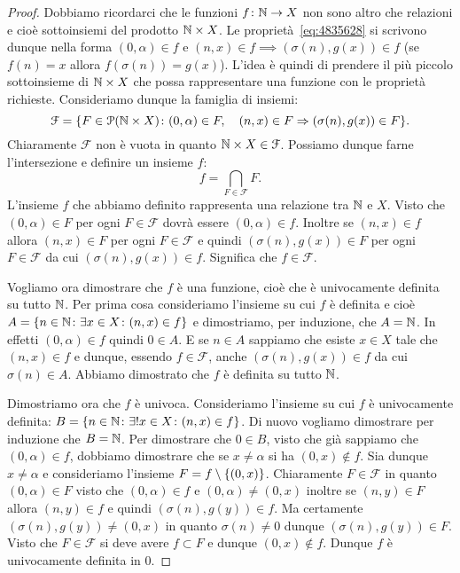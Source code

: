 \begin{proof}
Dobbiamo ricordarci che le funzioni $f\colon {\mathbb N} \to X$ non sono altro che relazioni 
e cioè sottoinsiemi del prodotto ${\mathbb N}\times X$.
Le proprietà~\eqref{eq:4835628} si scrivono dunque nella forma 
$(0,\alpha)\in f$ e $(n,x) \in f \implies (\sigma(n),g(x))\in f$
(se $f(n)=x$ allora $f(\sigma(n))=g(x)$).
L'idea è quindi di prendere il più piccolo sottoinsieme di ${\mathbb N}\times X$ 
che possa rappresentare una funzione con le proprietà richieste.
Consideriamo dunque la famiglia di insiemi:
\[
\mathcal F = {\left\{ F\in \mathcal P({\mathbb N}\times X)\colon 
  (0,\alpha)\in F,\quad (n,x)\in F \Rightarrow (\sigma(n),g(x))\in F \right\}}.
\]
Chiaramente $\mathcal F$ non è vuota in quanto ${\mathbb N}\times X \in \mathcal F$.
Possiamo dunque farne l'intersezione e definire un insieme $f$:
\[
  f = \bigcap_{F\in \mathcal F} F.
\]
L'insieme $f$ che abbiamo definito rappresenta una relazione tra ${\mathbb N}$ e $X$.
Visto che $(0,\alpha)\in F$ per ogni $F\in \mathcal F$ dovrà essere 
$(0,\alpha)\in f$.
Inoltre se $(n,x)\in f$ allora $(n,x)\in F$ per ogni $F\in \mathcal F$ 
e quindi $(\sigma(n),g(x))\in F$ per ogni $F\in \mathcal F$
da cui $(\sigma(n),g(x))\in f$. Significa che $f\in \mathcal F$.

Vogliamo ora dimostrare che $f$ è una funzione, cioè che è univocamente definita 
su tutto ${\mathbb N}$.
Per prima cosa consideriamo l'insieme su cui $f$ è definita 
e cioè $A={\left\{ n\in {\mathbb N}\colon \exists x\in X\colon (n,x)\in f \right\}}$
e dimostriamo, per induzione, che $A={\mathbb N}$.
In effetti $(0,\alpha)\in f$ quindi $0\in A$. 
E se $n\in A$ sappiamo che esiste $x\in X$ tale che $(n,x)\in f$ 
e dunque, essendo $f\in \mathcal F$, anche $(\sigma(n),g(x))\in f$
da cui $\sigma(n)\in A$. 
Abbiamo dimostrato che $f$ è definita su tutto ${\mathbb N}$.

Dimostriamo ora che $f$ è univoca. Consideriamo 
l'insieme su cui $f$ è univocamente definita: 
$B={\left\{ n\in {\mathbb N}\colon \exists! x\in X\colon (n,x)\in f \right\}}$.
Di nuovo vogliamo dimostrare per induzione che $B={\mathbb N}$. 
Per dimostrare che $0\in B$, visto che già sappiamo che $(0,\alpha)\in f$, 
dobbiamo dimostrare che se $x\neq \alpha$ si ha $(0,x)\not\in f$.
Sia dunque $x\neq \alpha$ e consideriamo 
l'insieme $F=f\setminus{\left\{ (0,x) \right\}}$.
Chiaramente $F\in \mathcal F$ in quanto $(0,\alpha)\in F$
visto che $(0,\alpha)\in f$ e $(0,\alpha)\neq (0,x)$
inoltre se $(n,y)\in F$ allora $(n,y)\in f$ 
e quindi $(\sigma(n),g(y)) \in f$.
Ma certamente $(\sigma(n),g(y))\neq (0,x)$ in quanto $\sigma(n)\neq 0$ 
dunque $(\sigma(n),g(y))\in F$.
Visto che $F\in \mathcal F$ si deve avere $f\subset F$ e dunque 
$(0,x)\not \in f$. Dunque $f$ è univocamente definita in $0$.


\end{proof}
